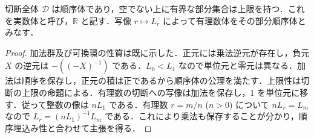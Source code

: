 \begin{prop}[実数体の存在]
切断全体 $\mathcal D$ は順序体であり，空でない上に有界な部分集合は上限を持つ．これを実数体と呼び，$\mathbb R$ と記す．写像 $r\mapsto L_r$ によって有理数体をその部分順序体とみなす．
\end{prop}
\begin{proof}
加法群及び可換環の性質は既に示した．正元には乗法逆元が存在し，負元 $X$ の逆元は $-((-X)^{-1})$ である．$L_0<L_1$ なので単位元と零元は異なる．加法は順序を保存し，正元の積は正であるから順序体の公理を満たす．上限性は切断の上限の命題による．有理数の切断への写像は加法を保存し，$1$ を単位元に移す．従って整数の像は $nL_1$ である．有理数 $r=m/n$ ($n>0$) について $nL_r=L_m$ なので $L_r=(nL_1)^{-1}L_m$ である．これにより乗法も保存することが分かり，順序埋込み性と合わせて主張を得る．
\end{proof}
